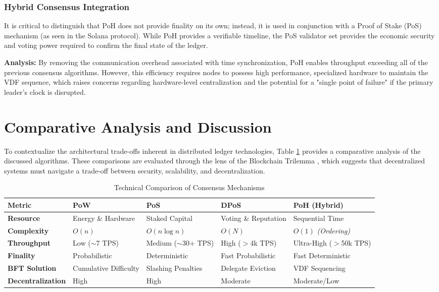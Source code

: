 \subsubsection{Hybrid Consensus Integration}
It is critical to distinguish that PoH does not provide finality on its own; instead, it is used in conjunction with a Proof of Stake (PoS) mechanism (as seen in the Solana protocol). While PoH provides a verifiable timeline, the PoS validator set provides the economic security and voting power required to confirm the final state of the ledger.

\textbf{Analysis:}
By removing the communication overhead associated with time synchronization, PoH enables throughput exceeding all of the previous consensus algorithms. However, this efficiency requires nodes to possess high performance, specialized hardware to maintain the VDF sequence, which raises concerns regarding hardware-level centralization and the potential for a "single point of failure" if the primary leader’s clock is disrupted.


\section{Comparative Analysis and Discussion} \label{ch2_comparison}

To contextualize the architectural trade-offs inherent in distributed ledger technologies, Table \ref{table:consensus_comparison} provides a comparative analysis of the discussed algorithms. These comparisons are evaluated through the lens of the Blockchain Trilemma \cite{buterin2017trilemma}, which suggests that decentralized systems must navigate a trade-off between security, scalability, and decentralization.

\begin{table}[h!]
\centering
\small
\renewcommand{\arraystretch}{1.8}
\begin{tabularx}{\textwidth}{|l|X|X|X|X|}
\hline
\textbf{Metric} & \textbf{PoW} & \textbf{PoS} & \textbf{DPoS} & \textbf{PoH (Hybrid)} \\ \hline
\textbf{Resource} & Energy \& Hardware & Staked Capital & Voting \& Reputation & Sequential Time \\ \hline
\textbf{Complexity} & $O(n)$ \cite{nakamoto2008bitcoin} & $O(n \log n)$ \cite{buterin2014ethereum} & $O(N)$ \cite{castro1999practical} & $O(1)$ \textit{(Ordering)} \\ \hline
\textbf{Throughput} & Low ($\sim$7 TPS) & Medium ($\sim$30+ TPS) & High ($>$4k TPS) & Ultra-High ($>$50k TPS) \\ \hline
\textbf{Finality} & Probabilistic & Deterministic & Fast Probabilistic & Fast Deterministic \\ \hline
\textbf{BFT Solution} & Cumulative Difficulty & Slashing Penalties & Delegate Eviction & VDF Sequencing \\ \hline
\textbf{Decentralization} & High & High & Moderate & Moderate/Low \\ \hline
\end{tabularx}
\caption{Technical Comparison of Consensus Mechanisms}
\label{table:consensus_comparison}
\end{table}



